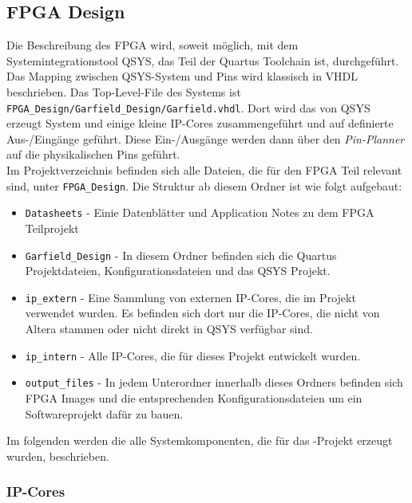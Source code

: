 \subsection{\ac{FPGA} Design}
Die Beschreibung des \ac{FPGA} wird, soweit möglich, mit dem Systemintegrationstool QSYS, das Teil der Quartus Toolchain ist, durchgeführt. Das Mapping zwischen QSYS-System und Pins wird klassisch in VHDL beschrieben. Das Top-Level-File des Systems ist \\ \texttt{FPGA\_Design/Garfield\_Design/Garfield.vhdl}. Dort wird das von QSYS erzeugt System und einige kleine \ac{IP}-Cores zusammengeführt und auf definierte Aus-/Eingänge geführt. Diese Ein-/Ausgänge werden dann über den \textit{Pin-Planner} auf die physikalischen Pins geführt.\\
Im Projektverzeichnis befinden sich alle Dateien, die für den \ac{FPGA} Teil relevant sind, unter \texttt{FPGA\_Design}. Die Struktur ab diesem Ordner ist wie folgt aufgebaut:
\begin{itemize}
	\item \texttt{Datasheets} - Einie Datenblätter und Application Notes zu dem \ac{FPGA} Teilprojekt
	\item \texttt{Garfield\_Design} - In diesem Ordner befinden sich die Quartus Projektdateien, Konfigurationsdateien und das QSYS Projekt.
	\item \texttt{ip\_extern} - Eine Sammlung von externen \ac{IP}-Cores, die im Projekt verwendet wurden. Es befinden sich dort nur die \ac{IP}-Cores, die nicht von Altera stammen oder nicht direkt in QSYS verfügbar sind.
	\item \texttt{ip\_intern} - Alle \ac{IP}-Cores, die für dieses Projekt entwickelt wurden.
	\item \texttt{output\_files} - In jedem Unterordner innerhalb dieses Ordners befinden sich \ac{FPGA} Images und die entsprechenden Konfigurationsdateien um ein Softwareprojekt dafür zu bauen.
\end{itemize}

Im folgenden werden die alle Systemkomponenten, die für das \Projectname-Projekt erzeugt wurden, beschrieben.

\subsubsection{\ac{IP}-Cores}
\label{IP-Cores}

